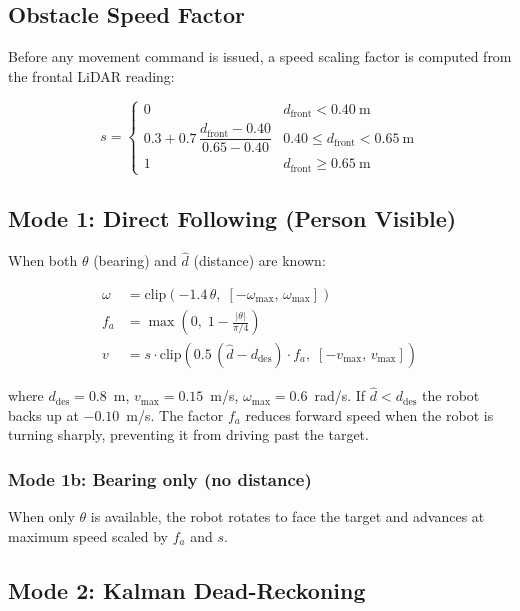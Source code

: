 \documentclass[12pt,a4paper]{article}
\begin{document}
\subsection{Obstacle Speed Factor}

Before any movement command is issued, a speed scaling factor is computed
from the frontal LiDAR reading:

\begin{equation}
  s = \begin{cases}
    0 & d_\text{front} < 0.40~\text{m} \\
    0.3 + 0.7\,\dfrac{d_\text{front} - 0.40}{0.65 - 0.40} & 0.40 \le d_\text{front} < 0.65~\text{m} \\
    1 & d_\text{front} \ge 0.65~\text{m}
  \end{cases}
\end{equation}

\subsection{Mode 1: Direct Following (Person Visible)}

When both $\theta$ (bearing) and $\hat{d}$ (distance) are known:

\begin{align}
  \omega &= \text{clip}\!\left(-1.4\,\theta,\; [-\omega_\text{max},\,\omega_\text{max}]\right) \\
  f_a    &= \max\!\left(0,\; 1 - \frac{|\theta|}{\pi/4}\right) \\
  v      &= s \cdot \text{clip}\!\left(0.5\,(\hat{d} - d_\text{des}) \cdot f_a,\;
             [-v_\text{max},\, v_\text{max}]\right)
\end{align}

where $d_\text{des} = 0.8$~m, $v_\text{max} = 0.15$~m/s,
$\omega_\text{max} = 0.6$~rad/s.  If $\hat{d} < d_\text{des}$ the robot
backs up at $-0.10$~m/s.  The factor $f_a$ reduces forward speed when the
robot is turning sharply, preventing it from driving past the target.

\subsubsection*{Mode 1b: Bearing only (no distance)}
When only $\theta$ is available, the robot rotates to face the target and
advances at maximum speed scaled by $f_a$ and $s$.

\subsection{Mode 2: Kalman Dead-Reckoning}
\end{document}
